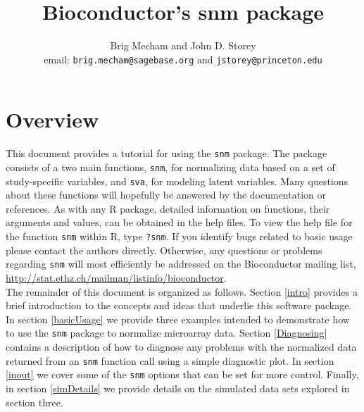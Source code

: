 \documentclass[11pt]{article}
\newcommand{\Rfunction}[1]{{\texttt{#1}}}
\newcommand{\Rpackage}[1]{{\texttt{#1}}}
\begin{document}
\title{Bioconductor's snm package}
\author{Brig Mecham and John D. Storey\\
email: \texttt{brig.mecham@sagebase.org} and \texttt{jstorey@princeton.edu}}

\maketitle

\tableofcontents

\section{Overview}

This document provides a tutorial for using the \Rpackage{snm} package.
The package consists of a two main functions, \Rfunction{snm}, for
normalizing data based on a set of study-specific variables, and \Rfunction{sva}, for
modeling latent variables.  Many questions
about these functions will hopefully be answered by the documentation or
references.  As with any R package, detailed information on functions, their arguments and
values, can be obtained in the help files. To view the
help file for the function \Rfunction{snm} within R, type \texttt{?snm}.  
If you identify bugs related to basic usage please
contact the authors directly.  Otherwise, any questions or problems regarding
\Rpackage{snm} will most efficiently be addressed on the Bioconductor mailing list, 
\url{http://stat.ethz.ch/mailman/listinfo/bioconductor}.
\\

The remainder of this document is organized as follows.  Section \ref{intro} provides a brief introduction to the
concepts and ideas that underlie this software package.  In section \ref{basicUsage} we provide three examples intended
to demonstrate how to use the \Rpackage{snm} package to normalize microarray data.  Section \ref{Diagnosing} contains a
description of how to diagnose any problems with the normalized data returned from an \Rfunction{snm} function call using
a simple diagnostic plot.  In section \ref{inout} we cover some of the \Rfunction{snm} options that can be set for more
control.  Finally, in section \ref{simDetails} we provide details on the simulated data sets explored in section three.  
\end{document}

